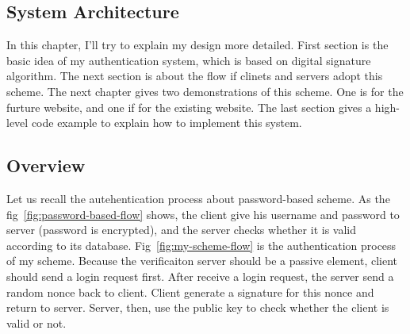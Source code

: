 \begin{CJK}{Bg5}{bsmi}


\chapter{System Architecture}

In this chapter, I'll try to explain my design more detailed. First section is the basic idea of my authentication system, which is based on digital signature algorithm. The next section is about the flow if clinets and servers adopt this scheme. The next chapter gives two demonstrations of this scheme. One is for the furture website, and one if for the existing website. The last section gives a high-level code example to explain how to implement this system.

\section{Overview}

Let us recall the autehentication process about password-based scheme. As the fig~\ref{fig:password-based-flow} shows, the client give his username and password to server (password is encrypted), and the server checks whether it is valid according to its database. Fig~\ref{fig:my-scheme-flow} is the authentication process of my scheme. Because the verificaiton server should be a passive element, client should send a login request first. After receive a login request, the server send a random nonce back to client. Client generate a signature for this nonce and return to server. Server, then, use the public key to check whether the client is valid or not.


\end{CJK}

